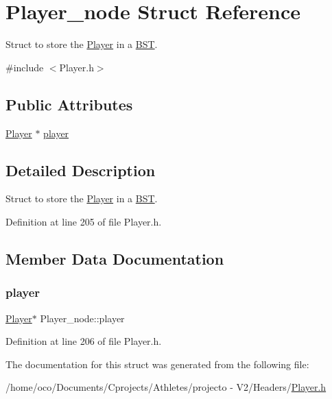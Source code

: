 \hypertarget{struct_player__node}{}\section{Player\+\_\+node Struct Reference}
\label{struct_player__node}


Struct to store the \hyperlink{class_player}{Player} in a \hyperlink{class_b_s_t}{B\+ST}.  




{\ttfamily \#include $<$Player.\+h$>$}

\subsection*{Public Attributes}
\begin{DoxyCompactItemize}
\item 
\hyperlink{class_player}{Player} $\ast$ \hyperlink{struct_player__node_a92957e7c45b23237ef919c046436c016}{player}
\end{DoxyCompactItemize}


\subsection{Detailed Description}
Struct to store the \hyperlink{class_player}{Player} in a \hyperlink{class_b_s_t}{B\+ST}. 

Definition at line 205 of file Player.\+h.



\subsection{Member Data Documentation}
\hypertarget{struct_player__node_a92957e7c45b23237ef919c046436c016}{}\label{struct_player__node_a92957e7c45b23237ef919c046436c016} 
\subsubsection{\texorpdfstring{player}{player}}
{\footnotesize\ttfamily \hyperlink{class_player}{Player}$\ast$ Player\+\_\+node\+::player}



Definition at line 206 of file Player.\+h.



The documentation for this struct was generated from the following file\+:\begin{DoxyCompactItemize}
\item 
/home/oco/\+Documents/\+Cprojects/\+Athletes/projecto -\/ V2/\+Headers/\hyperlink{_player_8h}{Player.\+h}\end{DoxyCompactItemize}
